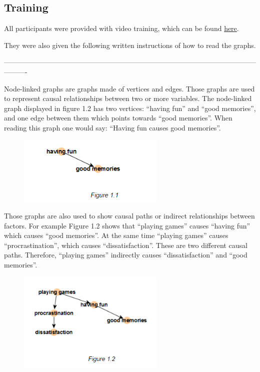 \documentclass{l4proj}
\begin{document}
\begin{appendices}
\section{Training}
\label{train}

All participants were provided with video training, which can be found \href{https://youtu.be/pkchO1fafrs}{here}.

They were also given the following written instructions of how to read the graphs.

----------------------------------------------------------------------------------------------------------------------

Node-linked graphs are graphs made of vertices and edges. Those graphs are used to
represent causal relationships between two or more variables. The node-linked graph displayed
in figure 1.2 has two vertices: “having fun” and “good memories”, and one edge between them
which points towards “good memories”. When reading this graph one would say: “Having fun
causes good memories”.

\begin{figure}[H]
\centering
\includegraphics[width=7cm]{images/training11.PNG}
\caption{}
\label{training11}
\end{figure}

Those graphs are also used to show causal paths or indirect relationships between factors.
For example Figure 1.2 shows that “playing games” causes “having fun” which causes “good
memories”. At the same time “playing games” causes “procrastination”, which causes
“dissatisfaction”. These are two different causal paths. Therefore, “playing games” indirectly
causes “dissatisfaction” and “good memories”.

\begin{figure}[H]
\centering
\includegraphics[width=7cm]{images/training12.PNG}
\caption{}
\label{training12}
\end{figure}


\end{appendices}
\end{document}
